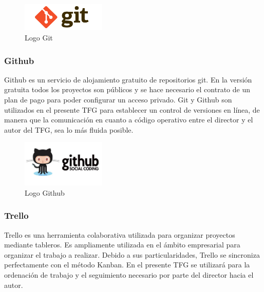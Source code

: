 		\begin{figure}[H]
		\centering
		\includegraphics[width=40mm, fbox={\fboxrule} 4mm]{images/04-metodo/18-git_logo.png}
		\caption{Logo Git}
		\label{fig:git-logo}
		\end{figure}
		
		\subsubsection{Github}
		\label{subsubsection:github}
		Github es un servicio de alojamiento gratuito de repositorios git. En la versión gratuita todos los proyectos son públicos y se hace necesario el contrato de un plan de pago para poder configurar un acceso privado.
		Git y Github son utilizados en el presente \ac{TFG} para establecer un control de versiones en línea, de manera que la comunicación en cuanto a código operativo entre el director y el autor del \ac{TFG}, sea lo más fluida posible.
		
		\begin{figure}[H]
		\centering
		\includegraphics[width=40mm, fbox={\fboxrule} 4mm]{images/04-metodo/19-github_logo.jpg}
		\caption{Logo Github}
		\label{fig:github-logo}
		\end{figure}
	
		\subsubsection{Trello}
		\label{subsubsection:trello}
		Trello es una herramienta colaborativa utilizada para organizar proyectos mediante tableros. Es ampliamente utilizada en el ámbito empresarial para organizar el trabajo a realizar. Debido a sus particularidades, Trello se sincroniza perfectamente con el método Kanban. En el presente \ac{TFG} se utilizará para la ordenación de trabajo y el seguimiento necesario por parte del director hacia el autor.
		
